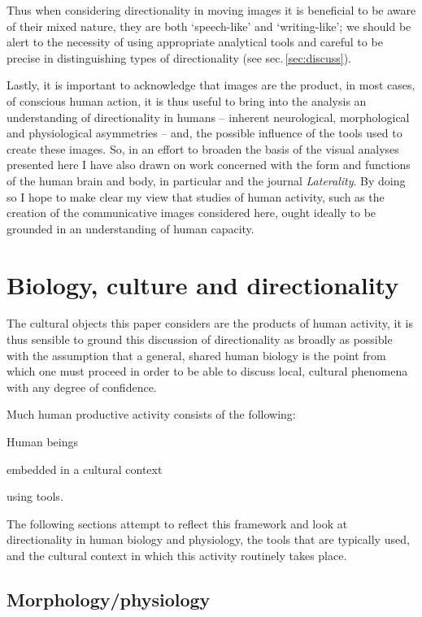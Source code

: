 \documentclass[11pt, oneside, a4paper]{scrartcl}
\let\footnote=\endnote
\newenvironment{close_item}{
\begin{itemize}
 \setlength{\itemsep}{1pt}
 \setlength{\parskip}{1pt}
 \setlength{\parsep}{0pt}}{\end{itemize}
}
\begin{document}
Thus when considering directionality in moving images it is beneficial to be aware of their mixed nature, they are both `speech-like' and `writing-like'; we should be alert to the necessity of using appropriate analytical tools and careful to be precise in distinguishing types of directionality (see sec.\,\ref{sec:discuss}).

\bigskip

Lastly, it is important to acknowledge that images are the product, in most cases, of conscious human action, it is thus useful to bring into the analysis an understanding of directionality in humans -- inherent neurological, morphological and physiological asymmetries -- and, the possible influence of the tools used to create these images. So, in an effort to broaden the basis of the visual analyses presented here I have also drawn on work concerned with the form and functions of the human brain and body, in particular \citet{McManus:2002} and the journal \emph{Laterality}\footnote{Psychology Press, ISSN: 1464-0678}. By doing so I hope to make clear my view that studies of human activity, such as the creation of the communicative images considered here, ought ideally to be grounded in an understanding of human capacity.

\section{Biology, culture and directionality}
The cultural objects this paper considers are the products of human activity, it is thus sensible to ground this discussion of directionality as broadly as possible with the assumption that a general, shared human biology is the point from which one must proceed in order to be able to discuss local, cultural phenomena with any degree of confidence.

Much human productive activity consists of the following:
\begin{close_item}
\item Human beings
\item embedded in a cultural context
\item using tools.
\end{close_item}

The following sections attempt to reflect this framework and look at directionality in human biology and physiology, the tools that are typically used, and the cultural context in which this activity routinely takes place.

\subsection{Morphology/physiology}
\end{document}
